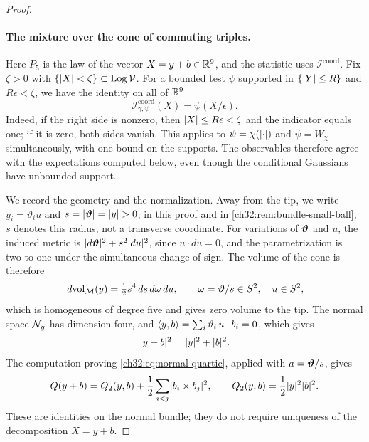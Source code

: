 \begin{proof}
\paragraph{The mixture over the cone of commuting triples.}
Here $P_5$ is the law of the vector $X=y+b\in\mathbb R^9$, and the statistic uses $\mathcal I^{\mathrm{coord}}$. Fix $\zeta>0$ with $\{\lvert X\rvert<\zeta\}\subset\operatorname{Log}\mathcal V$. For a bounded test $\psi$ supported in $\{\lvert Y\rvert\le R\}$ and $R\epsilon<\zeta$, we have the identity on all of $\mathbb R^9$
\begin{equation}\label{ch32:eq:bgm-coordinate-window}
 \mathcal I^{\mathrm{coord}}_{\gamma,\psi}(X)=\psi(X/\epsilon).
\end{equation}
Indeed, if the right side is nonzero, then $\lvert X\rvert\le R\epsilon<\zeta$ and the indicator equals one; if it is zero, both sides vanish. This applies to $\psi=\chi(\lvert \cdot\rvert)$ and $\psi=W_\chi$ simultaneously, with one bound on the supports. The observables therefore agree with the expectations computed below, even though the conditional Gaussians have unbounded support.

We record the geometry and the normalization. Away from the tip, we write $y_i=\vartheta_iu$ and $s=\lvert \bm\vartheta\rvert=\lvert y\rvert>0$; in this proof and in \cref{ch32:rem:bundle-small-ball}, $s$ denotes this radius, not a transverse coordinate. For variations of $\bm\vartheta$ and $u$, the induced metric is $\lvert d\bm\vartheta\rvert^2+s^2\lvert du\rvert^2$, since $u\cdot du=0$, and the parametrization is two-to-one under the simultaneous change of sign. The volume of the cone is therefore
\begin{equation}\label{ch32:eq:cone-volume}
 \,d\mathrm{vol}_{\mathcal M}(y)=\tfrac12s^4\,ds\,d\omega\,du,\qquad\omega=\bm\vartheta/s\in S^2,\quad u\in S^2,
\end{equation}
which is homogeneous of degree five and gives zero volume to the tip. The normal space $\mathcal N_{y}$ has dimension four, and $\langle y,b\rangle=\sum_i\vartheta_i\,u\cdot b_i=0$, which gives
\begin{equation}\label{ch32:eq:orthogonal-output}
 \lvert y+b\rvert^2=\lvert y\rvert^2+\lvert b\rvert^2.
\end{equation}
The computation proving \eqref{ch32:eq:normal-quartic}, applied with $a=\bm\vartheta/s$, gives
\begin{equation}\label{ch32:eq:bgm-quartic}
 Q(y+b)=Q_2(y,b)+\frac12\sum_{i<j}\lvert b_i\times b_j\rvert^2,\qquad Q_2(y,b)=\frac12\lvert y\rvert^2\lvert b\rvert^2.
\end{equation}
These are identities on the normal bundle; they do not require uniqueness of the decomposition $X=y+b$.


\end{proof}
